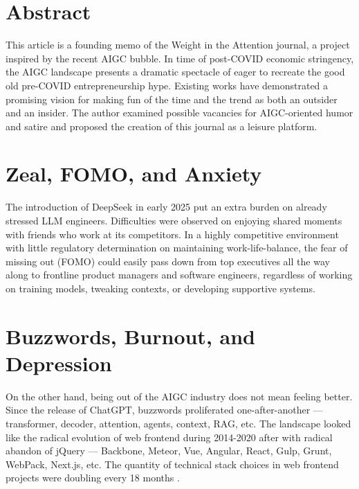




\section*{Abstract}
This article is a founding memo of the Weight in the Attention journal, a project inspired by the recent AIGC bubble.
In time of post-COVID economic stringency, the AIGC landscape presents a dramatic spectacle
of eager to recreate the good old pre-COVID entrepreneurship hype.
Existing works  have demonstrated a promising vision
for making fun of the time and the trend as both an outsider and an insider.
The author examined possible vacancies for AIGC-oriented humor and satire and proposed
the creation of this journal as a leisure platform.



\section{Zeal, FOMO, and Anxiety}
The introduction of DeepSeek in early 2025 put an extra burden \cite{tonypengds}
on already stressed LLM engineers.
Difficulties were observed on enjoying shared moments with friends who work at its competitors.
In a highly competitive environment with little regulatory determination on maintaining work-life-balance,
the fear of missing out (FOMO) could easily pass down from top executives all the way along to
frontline product managers and software engineers,
regardless of working on training models, tweaking contexts, or developing supportive systems.



\section{Buzzwords, Burnout, and Depression}
On the other hand, being out of the AIGC industry does not mean feeling better.
Since the release of ChatGPT, buzzwords proliferated one-after-another ---
transformer, decoder, attention, agents, context, RAG, etc.
The landscape looked like the radical evolution of web frontend during 2014-2020 after with radical abandon of jQuery ---
Backbone, Meteor, Vue, Angular, React, Gulp, Grunt, WebPack, Next.js, etc.
The quantity of technical stack choices in web frontend projects were doubling every 18 months \cite{Moore1965}.

